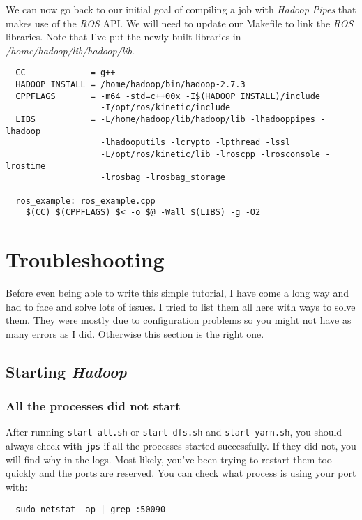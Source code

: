 \documentclass[a4paper, 12pt]{article}
\begin{document}
We can now go back to our initial goal of compiling a job with \textit{Hadoop Pipes} that makes use of the \textit{ROS} API. We will need to update our Makefile to link the \textit{ROS} libraries. Note that I've put the newly-built libraries in \textit{/home/hadoop/lib/hadoop/lib}.

\begin{verbatim}
  CC             = g++
  HADOOP_INSTALL = /home/hadoop/bin/hadoop-2.7.3
  CPPFLAGS       = -m64 -std=c++00x -I$(HADOOP_INSTALL)/include
                   -I/opt/ros/kinetic/include
  LIBS           = -L/home/hadoop/lib/hadoop/lib -lhadooppipes -lhadoop
                   -lhadooputils -lcrypto -lpthread -lssl
                   -L/opt/ros/kinetic/lib -lroscpp -lrosconsole -lrostime
                   -lrosbag -lrosbag_storage

  ros_example: ros_example.cpp
    $(CC) $(CPPFLAGS) $< -o $@ -Wall $(LIBS) -g -O2
\end{verbatim}

\section{Troubleshooting}

Before even being able to write this simple tutorial, I have come a long way and had to face and solve lots of issues. I tried to list them all here with ways to solve them. They were mostly due to configuration problems so you might not have as many errors as I did. Otherwise this section is the right one.

  \subsection{Starting \textit{Hadoop}}

    \subsubsection*{All the processes did not start}
    
After running \texttt{start-all.sh} or \texttt{start-dfs.sh} and \texttt{start-yarn.sh}, you should always check with \texttt{jps} if all the processes started successfully. If they did not, you will find why in the logs. Most likely, you've been trying to restart them too quickly and the ports are reserved. You can check what process is using your port with:

\begin{verbatim}
  sudo netstat -ap | grep :50090
\end{verbatim}
\end{document}
